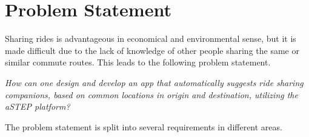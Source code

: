 \section{Problem Statement}
Sharing rides is advantageous in economical and environmental sense, but it is made difficult due to the lack of knowledge of other people sharing the same or similar commute routes.  This leads to the following problem statement.

\textit{How can one design and develop an app that automatically suggests ride sharing companions, based on common locations in origin and destination, utilizing the aSTEP platform?}

The problem statement is split into several requirements in different areas.